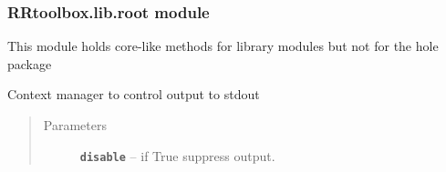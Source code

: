 \documentclass[letterpaper,10pt,english]{sphinxmanual}
\begin{document}
\subsubsection{RRtoolbox.lib.root module}
\label{RRtoolbox.lib:rrtoolbox-lib-root-module}\label{RRtoolbox.lib:module-RRtoolbox.lib.root}
This module holds core-like methods for library modules but not for the hole package

\begin{fulllineitems}
\label{RRtoolbox.lib:RRtoolbox.lib.root.Controlstdout}
Context manager to control output to stdout
\begin{quote}\begin{description}
\item[{Parameters}] \leavevmode
\textbf{\texttt{disable}} -- if True suppress output.

\end{description}\end{quote}

\end{fulllineitems}

\end{document}
